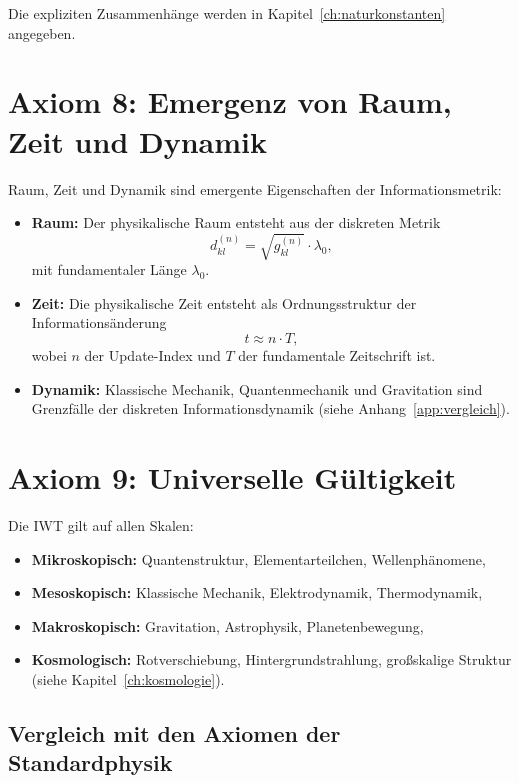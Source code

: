 Die expliziten Zusammenhänge werden in Kapitel~\ref{ch:naturkonstanten} angegeben.

\section{Axiom 8: Emergenz von Raum, Zeit und Dynamik}
\label{sec:axiom8}

Raum, Zeit und Dynamik sind emergente Eigenschaften der Informationsmetrik:

\begin{itemize}
    \item \textbf{Raum:} Der physikalische Raum entsteht aus der diskreten Metrik  
    \[
    d_{kl}^{(n)} = \sqrt{g_{kl}^{(n)}} \cdot \lambda_0,
    \]
    mit fundamentaler Länge \( \lambda_0 \).

    \item \textbf{Zeit:} Die physikalische Zeit entsteht als Ordnungsstruktur der Informationsänderung  
    \[
    t \approx n \cdot T,
    \]
    wobei \( n \) der Update-Index und \( T \) der fundamentale Zeitschrift ist.

    \item \textbf{Dynamik:} Klassische Mechanik, Quantenmechanik und Gravitation sind Grenzfälle der diskreten Informationsdynamik (siehe Anhang~\ref{app:vergleich}).
\end{itemize}

\section{Axiom 9: Universelle Gültigkeit}
\label{sec:axiom9}

Die IWT gilt auf allen Skalen:

\begin{itemize}
    \item \textbf{Mikroskopisch:} Quantenstruktur, Elementarteilchen, Wellenphänomene,
    \item \textbf{Mesoskopisch:} Klassische Mechanik, Elektrodynamik, Thermodynamik,
    \item \textbf{Makroskopisch:} Gravitation, Astrophysik, Planetenbewegung,
    \item \textbf{Kosmologisch:} Rotverschiebung, Hintergrundstrahlung, großskalige Struktur (siehe Kapitel~\ref{ch:kosmologie}).
\end{itemize}

\subsection{Vergleich mit den Axiomen der Standardphysik}
\label{sec:axiom_vergleich}

